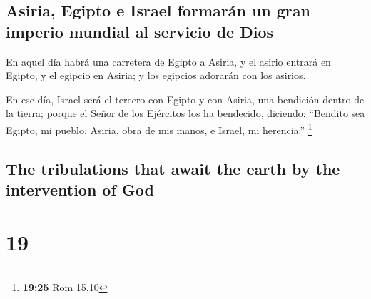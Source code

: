 \begin{paracol}{2}
\hypertarget{asiria-egipto-e-israel-formaruxe1n-un-gran-imperio-mundial-al-servicio-de-dios}{%
\subsection{Asiria, Egipto e Israel formarán un gran imperio mundial al
servicio de
Dios}\label{asiria-egipto-e-israel-formaruxe1n-un-gran-imperio-mundial-al-servicio-de-dios}}

 En aquel día habrá una carretera de Egipto a Asiria, y
el asirio entrará en Egipto, y el egipcio en Asiria; y los egipcios
adorarán con los asirios.

 En ese día, Israel será el tercero con Egipto y con
Asiria, una bendición dentro de la tierra;  porque el
Señor de los Ejércitos los ha bendecido, diciendo: ``Bendito sea Egipto,
mi pueblo, Asiria, obra de mis manos, e Israel, mi herencia.''
\footnote{\textbf{19:25} Rom 15,10}

\switchcolumn
\begin{otherlanguage}{english}

\hypertarget{the-tribulations-that-await-the-earth-by-the-intervention-of-god}{%
\subsection{The tribulations that await the earth by the intervention of
God}\label{the-tribulations-that-await-the-earth-by-the-intervention-of-god}}

\hypertarget{section-37}{%
\section{19}\label{section-37}}


\end{otherlanguage}
\end{paracol}
